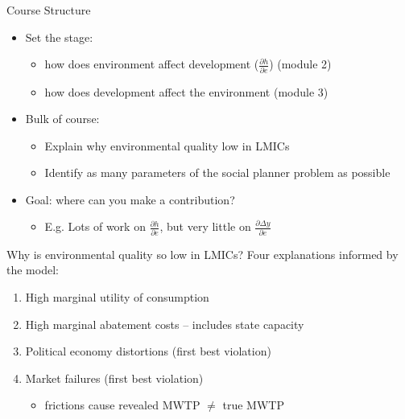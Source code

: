 \documentclass[
  ignorenonframetext,
  aspectratio=169]{beamer}
\providecommand{\tightlist}{%
  \setlength{\itemsep}{0pt}\setlength{\parskip}{0pt}}
\begin{document}
\begin{frame}{Course Structure}
\protect\hypertarget{course-structure-1}{}
\begin{itemize}
\tightlist
\item
  Set the stage:

  \begin{itemize}
  \tightlist
  \item
    how does environment affect development
    (\(\frac{\partial h}{\partial e}\)) (module 2)
  \item
    how does development affect the environment (module 3)
  \end{itemize}
\end{itemize}

\vfill

\begin{itemize}
\tightlist
\item
  Bulk of course:

  \begin{itemize}
  \tightlist
  \item
    Explain why environmental quality low in LMICs
  \item
    Identify as many parameters of the social planner problem as
    possible
  \end{itemize}
\end{itemize}

\vfill

\begin{itemize}
\tightlist
\item
  Goal: where can you make a contribution?

  \begin{itemize}
  \tightlist
  \item
    E.g. Lots of work on \(\frac{\partial h}{\partial e}\), but very
    little on \(\frac{\partial \Delta y}{\partial e}\)
  \end{itemize}
\end{itemize}
\end{frame}

\begin{frame}{Why is environmental quality so low in LMICs?}
\protect\hypertarget{why-is-environmental-quality-so-low-in-lmics}{}
Four explanations informed by the model:

\begin{enumerate}
\item
  High marginal utility of consumption
\item
  High marginal abatement costs -- includes state capacity
\item
  Political economy distortions (first best violation)
\item
  Market failures (first best violation)

  \begin{itemize}
  \tightlist
  \item
    frictions cause revealed MWTP \(\neq\) true MWTP
  \end{itemize}
\end{enumerate}
\end{frame}
\end{document}
